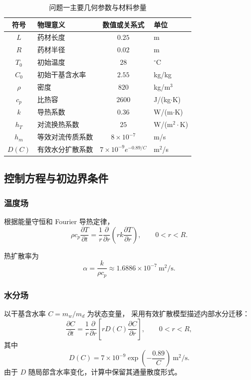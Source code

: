 \documentclass[UTF8,a4paper,12pt]{ctexart}
\begin{document}
\begin{table}[H]
\centering
\caption{问题一主要几何参数与材料参量}
\begin{tabular}{clcl}
\toprule
符号 & 物理意义 & 数值或关系式 & 单位\\
\midrule
$L$ & 药材长度 & $0.25$ & m\\
$R$ & 药材半径 & $0.02$ & m\\
$T_0$ & 初始温度 & $28$ & $^\circ$C\\
$C_0$ & 初始干基含水率 & $2.55$ & kg/kg\\
$\rho$ & 密度 & $820$ & kg/m$^3$\\
$c_p$ & 比热容 & $2600$ & J/(kg$\cdot$K)\\
$k$ & 导热系数 & $0.36$ & W/(m$\cdot$K)\\
$h_T$ & 对流换热系数 & $25$ & W/(m$^2\cdot$K)\\
$h_m$ & 等效对流传质系数 & $8\times10^{-7}$ & m/s\\
$D(C)$ & 有效水分扩散系数 & $7\times10^{-9}e^{-0.89/C}$ & m$^2$/s\\
\bottomrule
\end{tabular}
\end{table}

\subsection{控制方程与初边界条件}

\subsubsection{温度场}

根据能量守恒和 Fourier 导热定律，
\begin{equation}
\boxed{
\rho c_p\frac{\partial T}{\partial t}
=
\frac1r\frac{\partial}{\partial r}
\left(
rk\frac{\partial T}{\partial r}
\right)
},
\qquad 0<r<R.
\label{eq:heat}
\end{equation}

热扩散率为
\[
\alpha=\frac{k}{\rho c_p}
\approx1.6886\times10^{-7}\ \mathrm{m^2/s}.
\]

\subsubsection{水分场}

以干基含水率 $C=m_w/m_d$ 为状态变量，
采用有效扩散模型描述内部水分迁移：
\begin{equation}
\boxed{
\frac{\partial C}{\partial t}
=
\frac1r\frac{\partial}{\partial r}
\left[
rD(C)\frac{\partial C}{\partial r}
\right]
},
\qquad 0<r<R,
\label{eq:mass}
\end{equation}
其中
\[
D(C)=7\times10^{-9}
\exp\left(-\frac{0.89}{C}\right)
\ \mathrm{m^2/s}.
\]
由于 $D$ 随局部含水率变化，计算中保留其通量散度形式。
\end{document}
